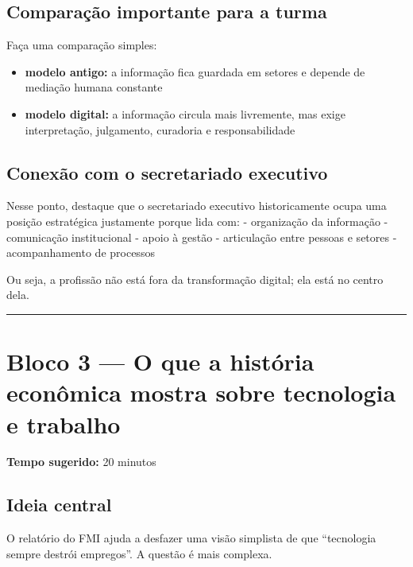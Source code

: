 \documentclass[
]{book}
\providecommand{\tightlist}{%
  \setlength{\itemsep}{0pt}\setlength{\parskip}{0pt}}
\theoremstyle{definition}
\theoremstyle{definition}
\theoremstyle{definition}
\theoremstyle{definition}
\theoremstyle{remark}
\begin{document}
\subsection{Comparação importante para a turma}\label{comparauxe7uxe3o-importante-para-a-turma}

Faça uma comparação simples:

\begin{itemize}
\tightlist
\item
  \textbf{modelo antigo:} a informação fica guardada em setores e depende de mediação humana constante
\item
  \textbf{modelo digital:} a informação circula mais livremente, mas exige interpretação, julgamento, curadoria e responsabilidade
\end{itemize}

\subsection{Conexão com o secretariado executivo}\label{conexuxe3o-com-o-secretariado-executivo}

Nesse ponto, destaque que o secretariado executivo historicamente ocupa uma posição estratégica justamente porque lida com:
- organização da informação
- comunicação institucional
- apoio à gestão
- articulação entre pessoas e setores
- acompanhamento de processos

Ou seja, a profissão não está fora da transformação digital; ela está no centro dela.

\begin{center}\rule{0.5\linewidth}{0.5pt}\end{center}

\section{Bloco 3 --- O que a história econômica mostra sobre tecnologia e trabalho}\label{bloco-3-o-que-a-histuxf3ria-econuxf4mica-mostra-sobre-tecnologia-e-trabalho}

\textbf{Tempo sugerido:} 20 minutos

\subsection{Ideia central}\label{ideia-central-1}

O relatório do FMI ajuda a desfazer uma visão simplista de que ``tecnologia sempre destrói empregos''. A questão é mais complexa.
\end{document}
